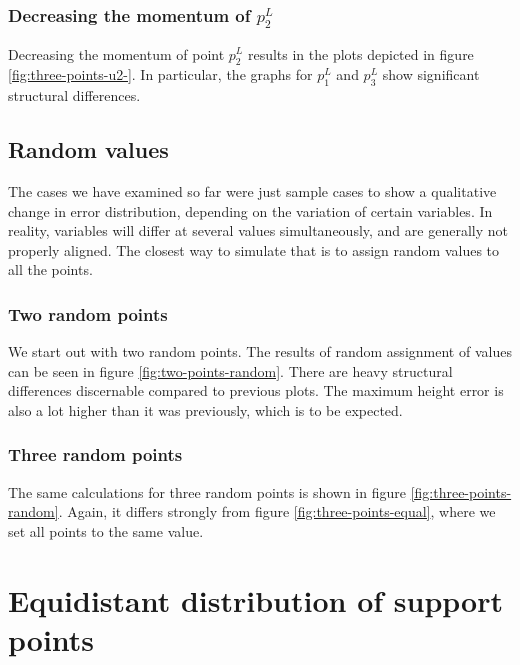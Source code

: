 \documentclass{article}
\begin{document}
\subsubsection{\texorpdfstring{Decreasing the momentum of $p_2^L$}{Decreasing the momentum of p2L}}
\label{sec:decreasing-momentum-of-p2}

Decreasing the momentum of point $p_2^L$ results in the plots depicted in figure \ref{fig:three-points-u2-}. In particular, the graphs for $p_1^L$ and $p_3^L$ show significant structural differences.



\subsection{Random values}
\label{sec:random-values}

The cases we have examined so far were just sample cases to show a qualitative change in error distribution, depending on the variation of certain variables. In reality, variables will differ at several values simultaneously, and are generally not properly aligned. The closest way to simulate that is to assign random values to all the points.

\subsubsection{Two random points}
\label{sec:two-random-points}

We start out with two random points. The results of random assignment of values can be seen in figure \ref{fig:two-points-random}. There are heavy structural differences discernable compared to previous plots. The maximum height error is also a lot higher than it was previously, which is to be expected.



\subsubsection{Three random points}
\label{sec:three-random-points}

The same calculations for three random points is shown in figure \ref{fig:three-points-random}. Again, it differs strongly from figure \ref{fig:three-points-equal}, where we set all points to the same value.



\section{Equidistant distribution of support points}
\label{sec:equidistant-distribution-of-support-points}
\end{document}
